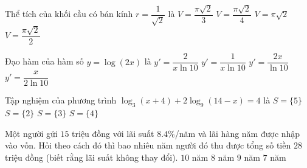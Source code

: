 \begin{ex}%
Thể tích của khối cầu có bán kính $r=\dfrac{1}{\sqrt{2}}$ là 
\choice
{\True $V=\dfrac{\pi \sqrt{2}}{3}$}
{$V=\dfrac{\pi \sqrt{2}}{4}$}
{$V=\pi \sqrt{2}$ }
{$V=\dfrac{\pi \sqrt{2}}{2}$}
\end{ex}

\begin{ex}%
Đạo hàm của hàm số $y=\log(2x)$ là
\choice
{$y'=\dfrac{2}{x\ln 10}$}
{\True $y'=\dfrac{1}{x\ln 10}$}
{$y'=\dfrac{2x}{\ln 10}$}
{$y'=\dfrac{x}{2\ln 10}$}
\end{ex}

\begin{ex}%
Tập nghiệm của phương trình $\log_3 (x+4)+2\log_9 (14-x)=4$ là 
\choice
{\True $S=\{ 5 \}$}
{$S=\{ 2 \}$}
{$S=\{ 3 \}$}
{$S=\{ 4 \}$}
\end{ex}

\begin{ex}%
Một người gửi $15$ triệu đồng với lãi suất $8.4 \%$/năm và lãi hàng năm được nhập vào vốn. Hỏi theo cách đó thì bao nhiêu năm người đó thu được tổng số tiền $28$ triệu đồng (biết rằng lãi suất không thay đổi).
\choice
{$10$ năm}
{\True $8$ năm}
{$9$ năm}
{$7$ năm}
\end{ex}

